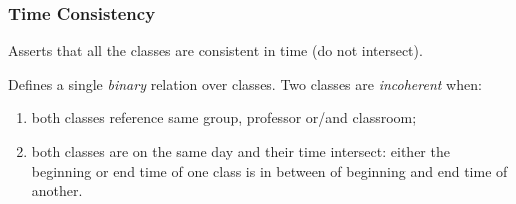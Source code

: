 \documentclass[../ThesisDoc]{subfiles}
\begin{document}
\subsubsection{Time Consistency}

Asserts that all the classes are consistent in time (do not intersect).

Defines a single \emph{binary} relation over classes.
Two classes are \emph{incoherent} when:
\begin{enumerate}
  \item both classes reference same group, professor or/and classroom;
  \item both classes are on the same day and their time intersect:
          either the beginning or end time of one class is in between of
          beginning and end time of another.
\end{enumerate}

\begin{center}
  
\end{center}
\end{document}

